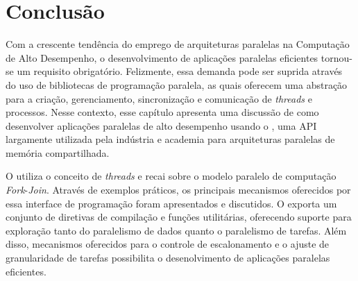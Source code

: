 \documentclass{SBCbookchapter}
\begin{document}
\section{Conclusão}
\label{sec:conclusao}

	Com a crescente tendência do emprego de arquiteturas paralelas na
	Computação de Alto Desempenho, o desenvolvimento de aplicações
	paralelas eficientes tornou-se um requisito obrigatório. Felizmente,
	essa demanda pode ser suprida através do uso de bibliotecas de
	programação paralela, as quais oferecem uma abstração para a
	criação, gerenciamento, sincronização e comunicação de
	\textit{threads} e processos. Nesse contexto, esse capítulo
	apresenta uma discussão de como desenvolver aplicações paralelas de
	alto desempenho usando o \openmp, uma API largamente utilizada pela
	indústria e academia para arquiteturas paralelas de memória
	compartilhada. 
	
	O \openmp utiliza o conceito de \textit{threads} e recai sobre o
	modelo paralelo de computação \textit{Fork}-\textit{Join}.  Através
	de exemplos práticos, os principais mecanismos oferecidos por essa
	interface de programação foram apresentados e discutidos. O \openmp
	exporta um conjunto de diretivas de compilação e funções
	utilitárias, oferecendo suporte para exploração tanto do paralelismo
	de dados quanto o paralelismo de tarefas. Além disso, mecanismos
	oferecidos para o controle de escalonamento e o ajuste de
	granularidade de tarefas possibilita o desenolvimento de aplicações
	paralelas eficientes.


\end{document}
